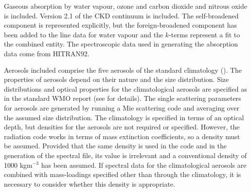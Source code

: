 \begin{enumerate}
Gaseous absorption by water vapour, ozone and carbon dioxide and nitrous
oxide is included. Version 2.1 of the CKD continuum is included. The
self-broadened component is represented explicitly, but the foreign-broadened
component has been added to the line data for water vapour and the $k$-terms
represent a fit to the combined entity.
The spectroscopic data used in generating the absorption data come from 
HITRAN92.

Aerosols included comprise the five aerosols of the standard climatology
(\citet{Cusack98a}).
The properties of aerosols depend on their nature and the size distribution.
Size distributions and optical properties for the climatological aerosols
are specified as in the standard WMO report (see \citet{Cusack98a} for
details). 
The single scattering parameters for aerosols are generated by running a 
Mie scattering code and averaging over the assumed size distribution.
The climatology is specified in terms of an optical depth, but densities
for the aerosols are not required or specified. However, the radiation
code works in terms of mass extinction coefficients, so a density must
be assumed. Provided that the same density is used in the code and in
the generation of the spectral file, its value is irrelevant and a 
conventional density of 1000 kgm${}^{-3}$ has been assumed. If spectral
data for the climatological aerosols are combined with mass-loadings
specified other than through the climatology, it is necessary to
consider whether this density is appropriate.


\end{enumerate}
